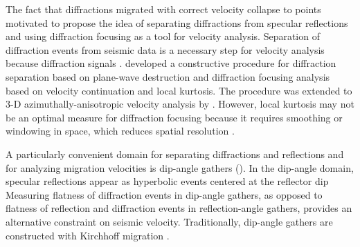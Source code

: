 The fact that diffractions migrated with correct velocity collapse to points motivated
 \cite{GEO49-11-18691880} to propose the idea of separating diffractions from specular reflections and using diffraction focusing as a tool for velocity analysis.
Separation of diffraction events from seismic data is a necessary step
for velocity analysis because diffraction signals   \cite[]{klem}. 
\cite{diffr} developed a constructive procedure for
diffraction separation based on plane-wave destruction and diffraction
focusing analysis based on velocity continuation and local
kurtosis. The procedure was extended to 3-D azimuthally-anisotropic
velocity analysis by \cite{will}. However, local kurtosis may not be
an optimal measure for diffraction focusing because it requires
smoothing or windowing in space, which reduces spatial resolution .

A particularly convenient domain for separating diffractions and
reflections and for analyzing migration velocities is dip-angle
gathers (\citealp{landa08,reshef09,klokov12}). In the dip-angle domain,
specular reflections appear as hyperbolic events centered at the
reflector dip  Measuring
flatness of diffraction events in dip-angle gathers, as opposed to
flatness of reflection and diffraction events in reflection-angle
gathers, provides an alternative constraint on seismic
velocity. Traditionally, dip-angle gathers are constructed with
Kirchhoff migration
\cite[]{Fomel.sep.100.sergey1,GEO66-06-18771894,GEO68-01-02320254,cheng11,koren11,bash,klokov3}.

